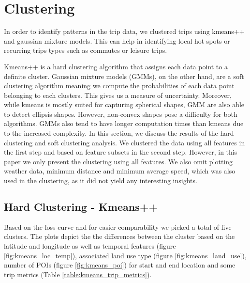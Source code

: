 \section{Clustering}
\label{sec:clustering}

In order to identify patterns in the trip data, we clustered trips using kmeans++ and gaussian mixture models. This can help in identifying local hot spots or recurring trips types such as commutes or leisure trips.

Kmeans++ is a hard clustering algorithm that assigns each data point to a definite cluster. Gaussian mixture models (GMMs), on the other  hand, are a soft clustering algorithm meaning we compute the probabilities of each data point belonging to each clusters. This gives us a measure of uncertainty. Moreover, while kmeans is mostly suited for capturing spherical shapes, GMM are also able to detect ellipsis shapes. However, non-convex shapes pose a difficulty for both algorithms. GMMs also tend to have longer computation times than kmeans due to the increased complexity.
In this section, we discuss the results of the hard clustering and soft clustering analysis. We clustered the data using all features in the first step and based on feature subsets in the second step. However, in this paper we only present the clustering using all features. We also omit plotting weather data, minimum distance and minimum average speed, which was also used in the clustering, as it did not yield any interesting insights.

\subsection{Hard Clustering - Kmeans++}
\label{sec:hard_clustering}

Based on the loss curve and for easier comparability we picked a total of five clusters. The plots depict the the differences between the cluster based on the latitude and longitude as well as temporal features (figure \ref{fig:kmeans_loc_temp}), associated land use type (figure \ref{fig:kmeans_land_use}), number of POIs (figure \ref{fig:kmeans_poi}) for start and end location and some trip metrics (Table \ref{table:kmeans_trip_metrics}).

